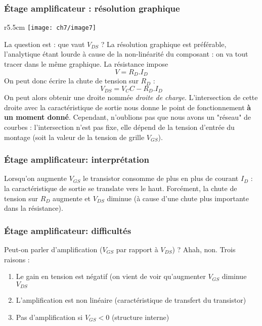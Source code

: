 	
		\subsubsection{Étage amplificateur : résolution graphique}
					\begin{wrapfigure}[11]{r}{5.5cm}
	\vspace{-0.5cm}
	\texttt{[image: ch7/image7]}
	\end{wrapfigure}
		La question est : que vaut $V_{DS}$ ? La résolution graphique est préférable, 
		l'analytique étant lourde à cause de la non-linéarité du composant : on va 
		tout tracer dans le même graphique. La résistance impose 
		\begin{equation}
		V = R_D.I_D
		\end{equation}
		On peut donc écrire la chute de tension sur $R_D$ :
		\begin{equation}
		V_{DS} = V_CC - R_D.I_D
		\end{equation}
		On peut alors obtenir une droite nommée \textit{droite de charge}. 
		L'intersection de cette droite avec la caractéristique de sortie nous donne 
		le point de fonctionnement \textbf{à un moment donné}. Cependant, n'oublions 
		pas que nous avons un "réseau" de courbes : l'intersection n'est pas fixe, 
		elle dépend de la tension d'entrée du montage (soit la valeur de la tension 
		de grille $V_{GS}$).
	
	\subsubsection{Étage amplificateur: interprétation}
	Lorsqu'on augmente $V_{GS}$ le transistor consomme de plus en plus de courant
	$I_D$ : la caractéristique de sortie se translate vers le haut. Forcément, la 
	chute de tension sur $R_D$ augmente et $V_{DS}$ diminue (à cause d'une chute 
	plus importante dans la résistance).
	
	\subsubsection{Étage amplificateur: difficultés}
	Peut-on parler d'amplification ($V_{GS}$ par rapport à $V_{DS}$) ? Ahah, non. Trois 
	raisons :
	\begin{enumerate}
	\item Le gain en tension est négatif (on vient de voir qu'augmenter $V_{GS}$ diminue 
	$V_{DS}$
	\item L'amplification est non linéaire (caractéristique de transfert du transistor)
	\item Pas d'amplification si $V_{GS} < 0$ (structure interne)
	\end{enumerate}
	
